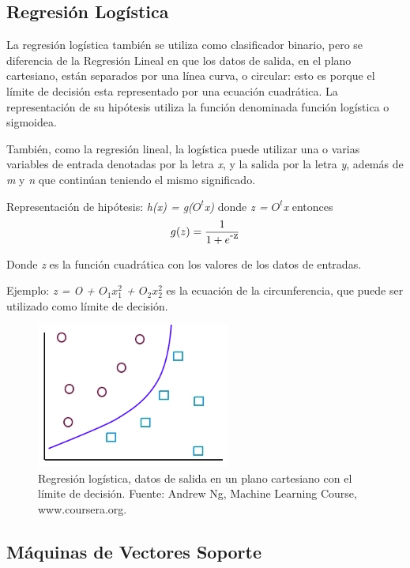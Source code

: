 \documentclass[a4paper,12pt,oneside,spanish]{book}
\begin{document}
\subsection{Regresión Logística}

La regresión logística también se utiliza como clasificador binario, pero se diferencia de la Regresión Lineal en que los datos de salida, en el plano cartesiano, están separados por una línea curva, o circular: esto es porque el límite de decisión esta representado por una ecuación cuadrática. La representación de su hipótesis utiliza la función denominada función logística o sigmoidea. \par

También, como la regresión lineal, la logística puede utilizar una o varias variables de entrada denotadas por la letra \textit{x}, y la salida por la letra \textit{y}, además de \textit{m} y \textit{n} que continúan teniendo el mismo significado. \par

Representación de hipótesis: \textit{h(x) = g($O^t$x)}
donde \textit{z = $O^t$x}
entonces 
\begin{equation}
	g(z) = \frac{1}{1 + e\raisebox{1ex}{-z}} 
\end{equation}

Donde \textit{z} es la función cuadrática con los valores de los datos de entradas. \par

Ejemplo: \textit{z = O + $O_1$$x^2_1$ + $O_2$$x^2_2$}  es la ecuación de la circunferencia, que puede ser utilizado como límite de decisión.

\begin{figure}[h!]
	\includegraphics[width=180pt]{Imagenes/regresion2.jpg}
	\centering
	\caption{Regresión logística, datos de salida en un plano cartesiano con el límite de decisión. Fuente: Andrew Ng, Machine Learning Course, www.coursera.org.}
	\label{fig:regresion2}
\end{figure}

\subsection{Máquinas de Vectores Soporte}
\end{document}
